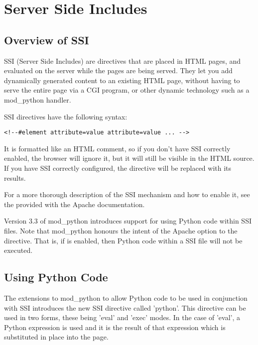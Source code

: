 \chapter{Server Side Includes\label{ssi}}

\section{Overview of SSI\label{ssi-overview}}

SSI (Server Side Includes) are directives that are placed in HTML pages,
and evaluated on the server while the pages are being served. They let you
add dynamically generated content to an existing HTML page, without having
to serve the entire page via a CGI program, or other dynamic technology
such as a mod_python handler.

SSI directives have the following syntax:

\begin{verbatim}
<!--#element attribute=value attribute=value ... -->
\end{verbatim}

It is formatted like an HTML comment, so if you don't have SSI correctly
enabled, the browser will ignore it, but it will still be visible in the
HTML source. If you have SSI correctly configured, the directive will be
replaced with its results.

For a more thorough description of the SSI mechanism and how to enable it,
see the  provided with the Apache documentation.

Version 3.3 of mod_python introduces support for using Python code within
SSI files. Note that mod_python honours the intent of the Apache
 option to the  directive. That is, if
 is enabled, then Python code within a SSI file will
not be executed.

\section{Using Python Code\label{ssi-python-code}}

The extensions to mod_python to allow Python code to be used in conjunction
with SSI introduces the new SSI directive called 'python'. This directive
can be used in two forms, these being 'eval' and 'exec' modes. In the case
of 'eval', a Python expression is used and it is the result of that
expression which is substituted in place into the page.

